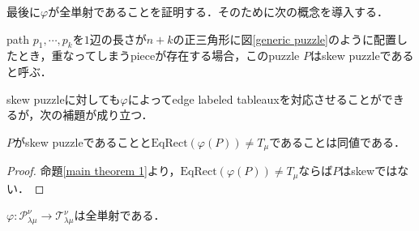 最後に$\varphi$が全単射であることを証明する．そのために次の概念を導入する．

\begin{defin}
  path $p_1,\cdots,p_k$を$1$辺の長さが$n+k$の正三角形に図\ref{generic puzzle}のように配置したとき，重なってしまうpieceが存在する場合，このpuzzle $P$はskew puzzleであると呼ぶ．
\end{defin}

skew puzzleに対しても$\varphi$によってedge labeled tableauxを対応させることができるが，次の補題が成り立つ．

\begin{lemm}\label{skew puzzle}
  $P$がskew puzzleであることと$\text{EqRect}(\varphi(P))\neq T_{\mu}$であることは同値である．
\end{lemm}

\begin{proof}
  命題\ref{main theorem 1}より，$\text{EqRect}(\varphi(P))\neq T_{\mu}$ならば$P$はskewではない．

  
\end{proof}

\begin{prop}
  $\varphi\colon\mathcal{P}^\nu_{\lambda\mu}\rightarrow\mathcal{T}^\nu_{\lambda\mu}$は全単射である．
\end{prop}

